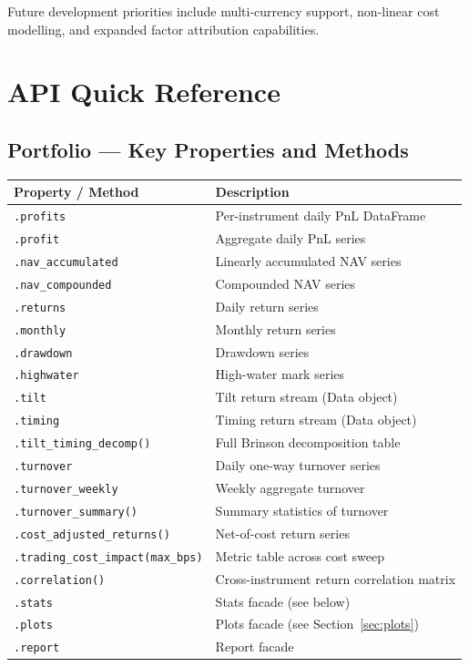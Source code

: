 \documentclass[11pt,a4paper]{article}
\begin{document}
Future development priorities include multi-currency support, non-linear cost
modelling, and expanded factor attribution capabilities.




\appendix

\section{API Quick Reference}
\label{app:api}

\subsection{Portfolio — Key Properties and Methods}

\begin{longtable}{@{}p{5.5cm}p{8.5cm}@{}}
\toprule
Property / Method & Description \\
\midrule
\endhead
\texttt{.profits} & Per-instrument daily PnL DataFrame \\
\texttt{.profit} & Aggregate daily PnL series \\
\texttt{.nav\_accumulated} & Linearly accumulated NAV series \\
\texttt{.nav\_compounded} & Compounded NAV series \\
\texttt{.returns} & Daily return series \\
\texttt{.monthly} & Monthly return series \\
\texttt{.drawdown} & Drawdown series \\
\texttt{.highwater} & High-water mark series \\
\texttt{.tilt} & Tilt return stream (Data object) \\
\texttt{.timing} & Timing return stream (Data object) \\
\texttt{.tilt\_timing\_decomp()} & Full Brinson decomposition table \\
\texttt{.turnover} & Daily one-way turnover series \\
\texttt{.turnover\_weekly} & Weekly aggregate turnover \\
\texttt{.turnover\_summary()} & Summary statistics of turnover \\
\texttt{.cost\_adjusted\_returns()} & Net-of-cost return series \\
\texttt{.trading\_cost\_impact(max\_bps)} & Metric table across cost sweep \\
\texttt{.correlation()} & Cross-instrument return correlation matrix \\
\texttt{.stats} & Stats facade (see below) \\
\texttt{.plots} & Plots facade (see Section~\ref{sec:plots}) \\
\texttt{.report} & Report facade \\
\bottomrule
\end{longtable}
\end{document}
